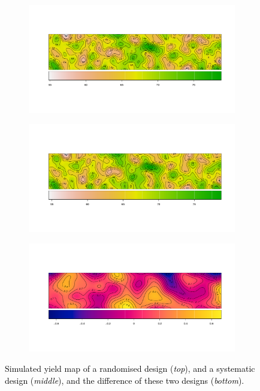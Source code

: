 \documentclass[a4paper]{article} 	%
\newcommand{\zc}[1]{\textcolor{black}{#1}}
\begin{document}
\begin{figure}[!htp]
\centering
    \begin{subfigure}[t]{0.9\textwidth}
		\centering
		\includegraphics[width=\linewidth]{quad_random_yield_mat.pdf}
    \end{subfigure}
    \begin{subfigure}[t]{0.9\textwidth}
		\centering
		\includegraphics[width=\linewidth]{quad_syst_yield_mat.pdf}
    \end{subfigure}
    \begin{subfigure}[t]{0.9\textwidth}
		\centering
		\includegraphics[width=\linewidth]{quad_diff_yield_mat.pdf}
    \end{subfigure}
	\caption{\zc{Simulated yield map of a randomised design (\textit{top}), and a systematic design (\textit{middle}), and the difference of these two designs (\textit{bottom}).}}\label{fig:yieldmap}
\end{figure}
\end{document}
